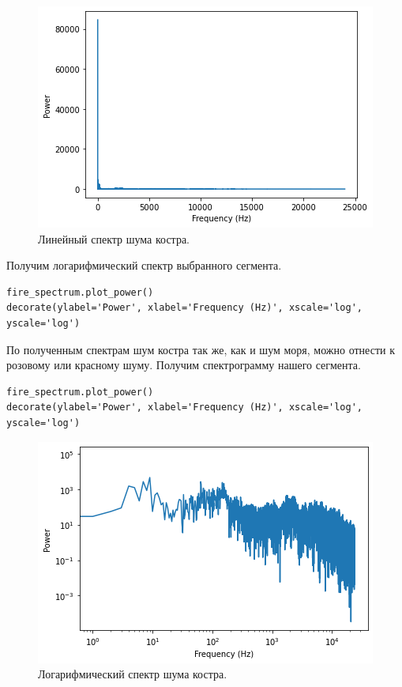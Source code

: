 \documentclass[a4paper, 14pt]{extarticle}
\begin{document}
    \begin{figure}[h]
        \centering
        \includegraphics[width=0.8\linewidth]{resources/Images/task1_fire_spectrum_lin}
        \caption{Линейный спектр шума костра.}
        \label{fig:task1_fire_spectrum_lin}
    \end{figure}

    Получим логарифмический спектр выбранного сегмента.

    \begin{lstlisting}[caption= Получение логарифмического спектра., label={lst:task1_fire_spectrum_log}]
fire_spectrum.plot_power()
decorate(ylabel='Power', xlabel='Frequency (Hz)', xscale='log', yscale='log')   \end{lstlisting}

    По полученным спектрам шум костра так же, как и шум моря, можно отнести к розовому или красному шуму.
    Получим спектрограмму нашего сегмента.

    \begin{lstlisting}[caption= Получение спектрограммы сегмента., label={lst:task1_fire_spectrogram}]
fire_spectrum.plot_power()
decorate(ylabel='Power', xlabel='Frequency (Hz)', xscale='log', yscale='log')   \end{lstlisting}

    \begin{figure}[H]
        \centering
        \includegraphics[width=0.7\linewidth]{resources/Images/task1_fire_spectrum_log}
        \caption{Логарифмический спектр шума костра.}
        \label{fig:task1_fire_spectrum_log}
    \end{figure}
\end{document}
